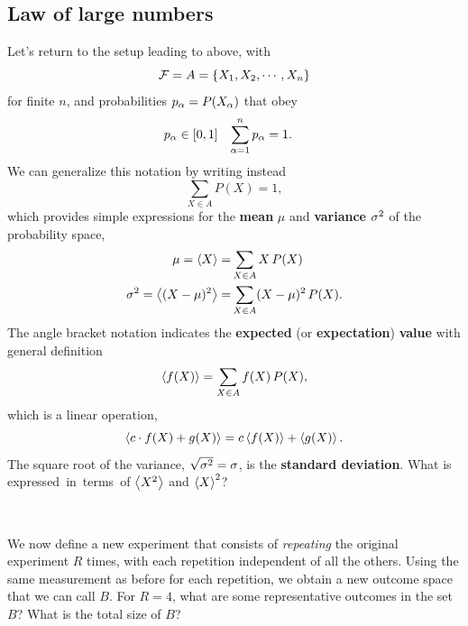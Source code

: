 \subsection{\label{sec:LLN}Law of large numbers}
Let's return to the setup leading to  above, with
\begin{equation*}
  \mathcal F = A = \left\{X_1, X_2, \cdots, X_n\right\}
\end{equation*}
for finite $n$, and probabilities $p_{\alpha} = P(X_{\alpha})$ that obey
\begin{align*}
  p_{\alpha} & \in [0, 1] &
  \sum_{\alpha = 1}^n p_{\alpha} & = 1.
\end{align*}
We can generalize this notation by writing instead
\begin{equation*}
  \sum_{X \in A} P(X) = 1,
\end{equation*}
which provides simple expressions for the \textbf{mean} $\mu$ and \textbf{variance} $\sigma^2$ of the probability space,
\begin{align}
              \mu = \left\langle X \right\rangle = & \sum_{X \in A} X \, P(X)            \label{eq:mean} \\
  \sigma^2 = \left\langle (X - \mu)^2 \right\rangle = & \sum_{X \in A} (X - \mu)^2 \, P(X). \label{eq:var}
\end{align}
The angle bracket notation indicates the \textbf{expected} (or \textbf{expectation}) \textbf{value} with general definition
\begin{equation}
  \label{eq:expect_disc}
  \left\langle f(X) \right\rangle = \sum_{X \in A} f(X) \, P(X),
\end{equation}
which is a linear operation,
\begin{equation*}
  \left\langle c\cdot f(X) + g(X) \right\rangle = c\left\langle f(X) \right\rangle + \left\langle g(X) \right\rangle.
\end{equation*}
The square root of the variance, $\sqrt{\sigma^2} = \sigma$, is the \textbf{standard deviation}.
What is \si expressed in terms of $\left\langle X^2 \right\rangle$ and $\left\langle X \right\rangle^2$?
\begin{mdframed}
  \ \\[100 pt]
\end{mdframed}

We now define a new experiment that consists of \textit{repeating} the original experiment $R$ times, with each repetition independent of all the others.
Using the same measurement as before for each repetition, we obtain a new outcome space that we can call $B$.
For $R = 4$, what are some representative outcomes in the set $B$?
What is the total size of $B$?
\begin{mdframed}
  \ \\[100 pt]
\end{mdframed}

